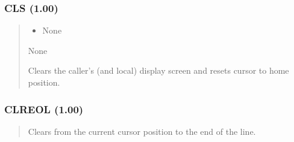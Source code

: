 \documentclass[letterpaper,10pt,english]{sphinxmanual}
\begin{document}
\subsubsection{CLS (1.00)}
\label{\detokenize{ppl:cls-1-00}}\begin{quote}

\sphinxAtStartPar
{}
\begin{description}
\begin{itemize}
\item {} 
\sphinxAtStartPar
None

\end{itemize}

\sphinxAtStartPar
None

\sphinxAtStartPar
Clears the caller’s (and local) display screen and resets cursor to home position.

\begin{sphinxVerbatim}[commandchars=\\\{\}]
 
\end{sphinxVerbatim}

\end{description}
\end{quote}


\subsubsection{CLREOL (1.00)}
\label{\detokenize{ppl:clreol-1-00}}\begin{quote}

\sphinxAtStartPar
{}
\begin{description}
\sphinxAtStartPar
Clears from the current cursor position to the end of the line.

\end{description}
\end{quote}
\end{document}
